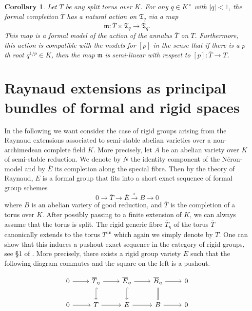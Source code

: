 \documentclass[11pt,oneside]{amsart}
\newtheorem{corollary}[theorem]{Corollary}
\theoremstyle{definition}
\theoremstyle{remark}
\begin{document}
	\begin{corollary}\label{action on formal model of torus}
		Let $T$ be any split torus over $K$. For any $q\in K^\times$ with $|q|<1$, the formal completion $\overline{T}$ has a natural action on $\mathfrak T_q$ via a map
		\[\mathfrak m:\overline{T}\times \mathfrak T_q\rightarrow \mathfrak T_q.\]
		This map is a formal model of the action of the annulus $\overline{T}$ on $T$. Furthermore, this action is compatible with the models for $[p]$ in the sense that if there is a $p$-th root $q^{1/p}\in K$, then the map $\mathfrak m$ is semi-linear with respect to $[p]:\overline{T}\rightarrow{T}$.
	\end{corollary} 
	
	\section{Raynaud extensions as principal bundles of formal and rigid spaces}
	In the following we want consider the case of rigid groups arising from the Raynaud extensions associated to semi-stable abelian varieties over a non-archimedean complete field $K$. More precisely, let $A$ be an abelian variety over $K$ of semi-stable reduction. We denote by $N$ the identity component of the N\'eron-model and by $\overline E$ its completion along the special fibre. Then by the theory of Raynaud, $\overline E$ is a formal group that fits into a short exact sequence of formal group schemes
	\begin{equation}\label{formal Raynaud extension}
	0\rightarrow \overline T \rightarrow \overline E \xrightarrow{\pi} B\rightarrow 0
	\end{equation}
	where $B$ is an abelian variety of good reduction, and $\overline{T}$ is the completion of a torus over $K$.
	After possibly passing to a finite extension of $K$, we can always assume that the torus is split. The rigid generic fibre $\overline{T}_\eta$ of the torus $\overline{T}$ canonically extends to the torus $T^{\operatorname{an}}$ which again we simply denote by $T$. One can show that this induces a pushout exact sequence in the category of rigid groups, see \S 1 of \cite{BL}. More precisely, there exists a rigid group variety $E$ such that the following diagram commutes and the square on the left is a pushout.
	\begin{center}
		\begin{equation}
		\begin{tikzcd}
			0 \arrow[r] & \overline{T}_\eta \arrow[d, hook] \arrow[r] & \overline{E}_\eta \arrow[d, hook] \arrow[r] & \overline{B}_\eta \arrow[d,equal] \arrow[r] & 0 \\
			0 \arrow[r] & T \arrow[r] & E \arrow[r] & B \arrow[r] & 0
		\end{tikzcd}
		\end{equation}
	\end{center}
	
\end{document}
